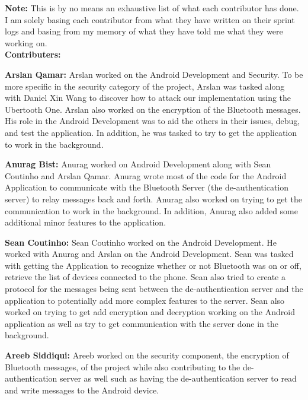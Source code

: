 \documentclass[letterpaper,twocolumn,10pt]{article}
\begin{document}
{{\textbf{Note:} This is by no means an exhaustive list of what each contributor has done. I am solely basing each contributor from what they have written on their sprint logs and basing from my memory of what they have told me what they were working on.\\

\large
\textbf{Contributers:}
\normalsize

\textbf{Arslan Qamar:} Arslan worked on the Android Development and Security. To be more specific in the security category of the project, Arslan was tasked along with Daniel Xin Wang to discover how to attack our implementation using the Ubertooth One. Arslan also worked on the encryption of the Bluetooth messages. His role in the Android Development was to aid the others in their issues, debug, and test the application. In addition, he was tasked to try to get the application to work in the background.

\textbf{Anurag Bist:} Anurag worked on Android Development along with Sean Coutinho and Arslan Qamar. Anurag wrote most of the code for the Android Application to communicate with the Bluetooth Server (the de-authentication server) to relay messages back and forth. Anurag also worked on trying to get the communication to work in the background. In addition, Anurag also added some additional minor features to the application.

\textbf{Sean Coutinho:} Sean Coutinho worked on the Android Development. He worked with Anurag and Arslan on the Android Development. Sean was tasked with getting the Application to recognize whether or not Bluetooth was on or off, retrieve the list of devices connected to the phone. Sean also tried to create a protocol for the messages being sent between the de-authentication server and the application to potentially add more complex features to the server. Sean also worked on trying to get add encryption and decryption working on the Android application as well as try to get communication with the server done in the background.

\textbf{Areeb Siddiqui:} Areeb worked on the security component, the encryption of Bluetooth messages, of the project while also contributing to the de-authentication server as well such as having the de-authentication server to read and write messages to the Android device.

}}
\end{document}

